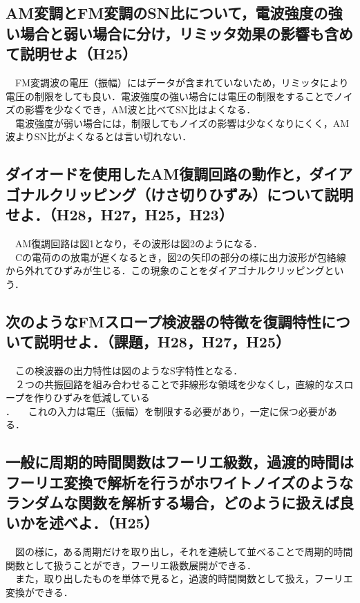 \subsection{AM変調とFM変調のSN比について，電波強度の強い場合と弱い場合に分け，リミッタ効果の影響も含めて説明せよ（H25）}
　FM変調波の電圧（振幅）にはデータが含まれていないため，リミッタにより電圧の制限をしても良い．電波強度の強い場合には電圧の制限をすることでノイズの影響を少なくでき，AM波と比べてSN比はよくなる．\\
　電波強度が弱い場合には，制限してもノイズの影響は少なくなりにくく，AM波よりSN比がよくなるとは言い切れない．\\

\subsection{ダイオードを使用したAM復調回路の動作と，ダイアゴナルクリッピング（けさ切りひずみ）について説明せよ．（H28，H27，H25，H23）}
\vspace{4cm}
　AM復調回路は図1となり，その波形は図2のようになる．\\
　Cの電荷のの放電が遅くなるとき，図2の矢印の部分の様に出力波形が包絡線から外れてひずみが生じる．この現象のことをダイアゴナルクリッピングという．\\

\subsection{次のようなFMスロープ検波器の特徴を復調特性について説明せよ．（課題，H28，H27，H25）}
\vspace{4cm}
　この検波器の出力特性は図のようなS字特性となる．\\
　２つの共振回路を組み合わせることで非線形な領域を少なくし，直線的なスロープを作りひずみを低減している\\．
　これの入力は電圧（振幅）を制限する必要があり，一定に保つ必要がある．\\

\subsection{一般に周期的時間関数はフーリエ級数，過渡的時間はフーリエ変換で解析を行うがホワイトノイズのようなランダムな関数を解析する場合，どのように扱えば良いかを述べよ．（H25）}
\vspace{4cm}
　図の様に，ある周期だけを取り出し，それを連続して並べることで周期的時間関数として扱うことができ，フーリエ級数展開ができる．\\
　また，取り出したものを単体で見ると，過渡的時間関数として扱え，フーリエ変換ができる．\\

